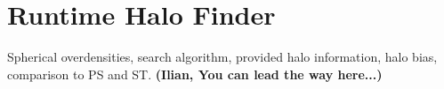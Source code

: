 \section{Runtime Halo Finder}
\label{sec:halo}

Spherical overdensities, search algorithm, 
provided halo information, halo bias, comparison to PS and ST.
{\bf (Ilian, You can lead the way here...)}